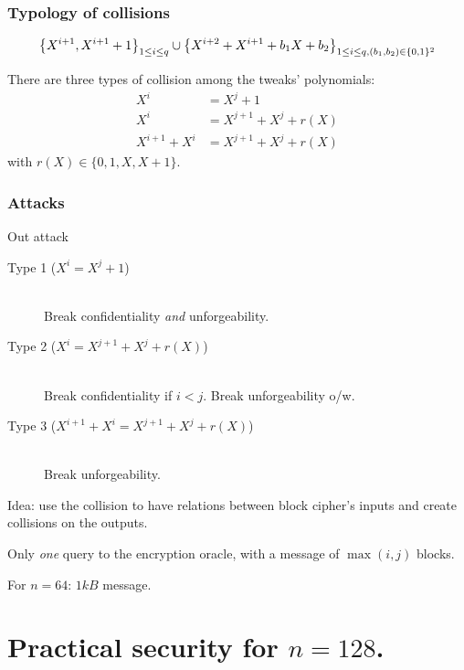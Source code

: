 \documentclass{beamer}
\begin{document}
				\begin{frame}
					\frametitle{Typology of collisions}
		
					\[
					\left\{X^{i+1}, X^{i+1} +1 \right\}_{1\leq i \leq q} \cup \left\{ X^{i+2} + X^{i+1} + b_1 X + b_2\right\}_{1\leq i \leq q, (b_1,b_2) \in \{0, 1\}^2}
					\]
		
					\vspace{0.5cm}
					There are three types of collision among the tweaks' polynomials:
					\begin{align}
						X^i &= X^j + 1 \\
						X^i & = X^{j+1} + X^j + r(X) \\
						X^{i+1} + X^i & = X^{j+1} + X^j + r(X)
					\end{align}
					with $r(X) \in \{0, 1, X, X+1\}$.
	
				\end{frame}

				\begin{frame}
					\frametitle{Attacks}

					\begin{block}{Out attack}
						\begin{description}
							\item[Type 1 ($X^i = X^j + 1$)] \ \\
							Break confidentiality \emph{and} unforgeability.   
							\item[Type 2 ($X^i  = X^{j+1} + X^j + r(X)$)] \ \\ Break confidentiality if $i < j$. Break unforgeability o/w.   
							\item[Type 3 ($X^{i+1} + X^i  = X^{j+1} + X^j + r(X)$)]  \ \\
							Break unforgeability.   
						\end{description}
					\end{block}

					Idea: use the collision to have relations between block cipher's inputs and create collisions on the outputs.
		
					Only \emph{one} query to the encryption oracle, with a message of $\max(i,j)$ blocks.
		
					For $n = 64$: $1kB$ message. 
				\end{frame}



				\section{Practical security for $n = 128$.} %
				\label{sec:practical_security_for_n_128}
\end{document}
